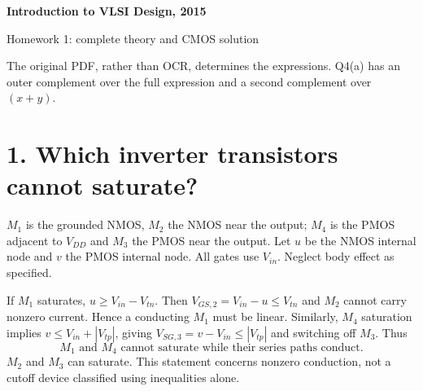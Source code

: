 \documentclass[11pt]{article}
\newcommand{\mos}[4]{\begin{scope}[shift={(#1,#2)}]
\draw (0,.24)--(0,-.24);
\draw (0,.20)--(.25,.20)--(.25,.5);
\draw (0,-.20)--(.25,-.20)--(.25,-.5);
\draw (-.16,.23)--(-.16,-.23);
\ifnum#4=1\draw (-.26,0) circle (.06);\draw (-.75,0)--(-.32,0);\else\draw (-.75,0)--(-.16,0);\fi
\node[anchor=east,font=\small] at (-.76,0) {$#3$};
\end{scope}}
\newcommand{\ground}[2]{\draw (#1,#2)--(#1,{#2-.12});\draw ({#1-.17},{#2-.12})--({#1+.17},{#2-.12});\draw ({#1-.11},{#2-.20})--({#1+.11},{#2-.20});}
\newcommand{\rail}[3]{\draw (#1,#2)--(#1,{#2+.15});\node[above,font=\small] at (#1,{#2+.15}) {$#3$};}
\newcommand{\outputnode}[3]{\fill (#1,#2) circle (.04);\draw (#1,#2)--({#1+.7},#2) node[right] {$#3$};}
\begin{document}
\begin{center}{\Large\bfseries Introduction to VLSI Design, 2015}\par{\large Homework 1: complete theory and CMOS solution}\end{center}
The original PDF, rather than OCR, determines the expressions. Q4(a) has an outer complement over the full expression and a second complement over $(x+y)$.

\section*{1. Which inverter transistors cannot saturate?}
$M_1$ is the grounded NMOS, $M_2$ the NMOS near the output; $M_4$ is the PMOS adjacent to $V_{DD}$ and $M_3$ the PMOS near the output. Let $u$ be the NMOS internal node and $v$ the PMOS internal node. All gates use $V_{in}$. Neglect body effect as specified.

\begin{center}\end{center}
If $M_1$ saturates, $u\ge V_{in}-V_{tn}$. Then $V_{GS,2}=V_{in}-u\le V_{tn}$ and $M_2$ cannot carry nonzero current. Hence a conducting $M_1$ must be linear. Similarly, $M_4$ saturation implies $v\le V_{in}+|V_{tp}|$, giving $V_{SG,3}=v-V_{in}\le|V_{tp}|$ and switching off $M_3$. Thus
\[
\boxed{M_1\text{ and }M_4\text{ cannot saturate while their series paths conduct.}}
\]
$M_2$ and $M_3$ can saturate. This statement concerns nonzero conduction, not a cutoff device classified using inequalities alone.
\end{document}

